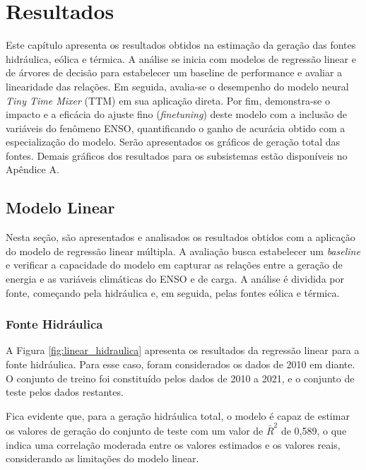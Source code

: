 \chapter{Resultados}
Este capítulo apresenta os resultados obtidos na estimação da geração das fontes hidráulica, eólica e térmica. A análise 
se inicia com modelos de regressão linear e de árvores de decisão para estabelecer um baseline de performance e 
avaliar a linearidade das relações. Em seguida, avalia-se o desempenho do modelo 
neural \textit{Tiny Time Mixer} (TTM) em sua aplicação direta. Por fim, demonstra-se o impacto e a 
eficácia do ajuste fino (\textit{finetuning}) deste modelo com a inclusão de variáveis do fenômeno ENSO, quantificando o ganho de 
acurácia obtido com a especialização do modelo. Serão apresentados os gráficos de geração total das fontes. Demais gráficos 
dos resultados para os subsistemas estão disponíveis no Apêndice A.

\section{Modelo Linear}
Nesta seção, são apresentados e analisados os resultados obtidos com a aplicação do modelo de regressão linear múltipla. A avaliação busca 
estabelecer um \textit{baseline} e verificar a capacidade do modelo em capturar as relações entre a geração de energia e 
as variáveis climáticas do ENSO e de carga. A análise é dividida por fonte, começando pela hidráulica e, em seguida, pelas fontes 
eólica e térmica.
\subsection{Fonte Hidráulica}
A Figura \ref{fig:linear_hidraulica} apresenta os resultados da regressão linear para a fonte hidráulica. Para esse caso,
foram considerados os dados de 2010 em diante. O conjunto de treino foi constituído pelos dados de 2010 a 2021, e o 
conjunto de teste pelos dados restantes. 

\begin{figure}[!ht]
  {}
  {}
\end{figure}
Fica evidente que, para a geração hidráulica total, o modelo é capaz de estimar os valores de geração do conjunto de teste
com um valor de $\bar{R}^2$ de 0,589, o que indica uma correlação moderada entre os valores estimados e os valores reais, considerando
as limitações do modelo linear. 

